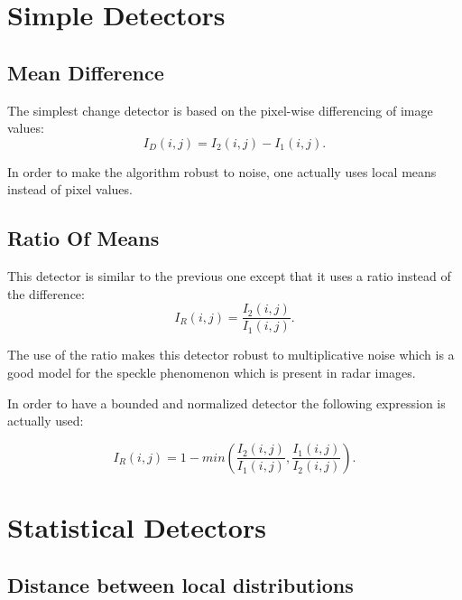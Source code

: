 \section{Simple Detectors}
\label{sec:SimpleDetectors}
\subsection{Mean Difference}
\label{sec:MeanDifference}

The simplest change detector is based on the pixel-wise differencing
of image values: 
\begin{equation}
I_{D}(i,j)=I_{2}(i,j)-I_{1}(i,j).
\end{equation}

In order to make the algorithm robust to noise, one actually uses
local means instead of pixel values.



\subsection{Ratio Of Means}
\label{sec:RatioOfMeans}

This detector is similar to the previous one except that it uses a
ratio instead of the difference:
\begin{equation}
\displaystyle I_{R}(i,j) = \frac{\displaystyle I_{2}(i,j)}{\displaystyle I_{1}(i,j)}.
\end{equation}

The use of the ratio makes this detector robust to multiplicative
noise which is a good model for the speckle phenomenon which is
present in radar images.

In order to have a bounded and normalized detector the following
expression is actually used:


\begin{equation}
\displaystyle I_{R}(i,j) = 1 - min \left(\frac{\displaystyle I_{2}(i,j)}{\displaystyle I_{1}(i,j)},\frac{\displaystyle I_{1}(i,j)}{\displaystyle I_{2}(i,j)}\right).
\end{equation}





\section{Statistical Detectors}
\label{sec:StatisticalDetectors}

\subsection{Distance between local distributions}
\label{sec:KullbackLeiblerDistance}

